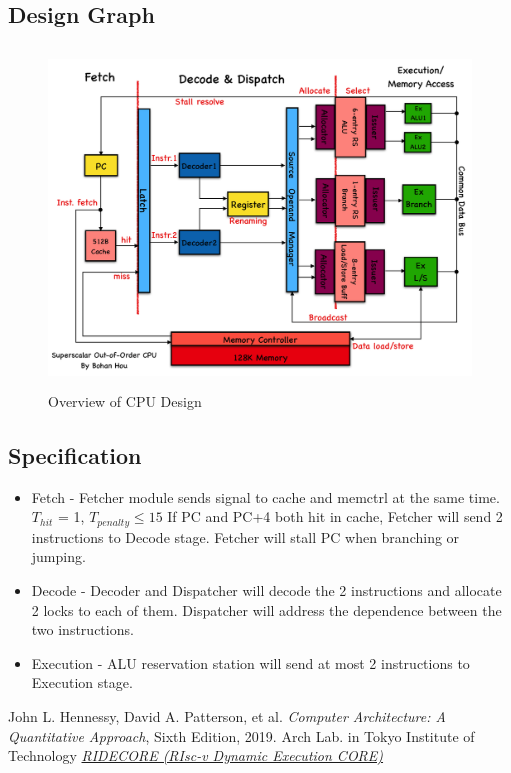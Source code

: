 \documentclass[12pt, a4paper]{article}
\theoremstyle{margin}
\begin{document}
\subsection{Design Graph}

\begin{figure}[H]
	\begin{center}
	  \includegraphics[height=9cm]{structure.png}
	\end{center}
	\caption{Overview of CPU Design}
\end{figure}

\subsection{Specification}
\begin{itemize}
  \item Fetch - Fetcher module sends signal to cache and memctrl at the same time. $T_{hit}$ = 1, $T_{penalty} \leq 15$ 
        If PC and PC+4 both hit in cache, Fetcher will send 2 instructions to Decode stage. 
        Fetcher will stall PC when branching or jumping. 
  \item Decode - Decoder and Dispatcher will decode the 2 instructions and allocate 2 locks to each of them. 
                 Dispatcher will address the dependence between the two instructions. 
  \item Execution - ALU reservation station will send at most 2 instructions to Execution stage.                
\end{itemize}

\begin{thebibliography}{9}
	John L. Hennessy, David A. Patterson, et al.
	\emph{Computer Architecture: A Quantitative Approach},
	Sixth Edition, 2019.
  Arch Lab. in Tokyo Institute of Technology
  \emph{\href{https://github.com/ridecore/ridecore}{RIDECORE (RIsc-v Dynamic Execution CORE)}}
  
\end{thebibliography}
\end{document}
